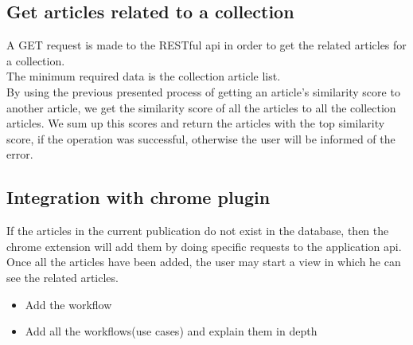 \subsection{Get articles related to a collection}
\label{sec:workflow-get-articles-related-to-collection}
A GET request is made to the RESTful api in order to get the related articles for  a collection.
\\ The minimum required data is the collection article list.
\\ By using the previous presented process of getting an article’s similarity score to another article, we get the similarity score of all the articles to all the collection articles. We sum up this scores and return the articles with the top similarity score, if the operation was successful, otherwise the user will be informed of the error.

\subsection{Integration with chrome plugin}
\label{sec:workflow-integration-with-chrome-plugin}
If the articles in the current publication do not exist in the database, then the chrome extension will add them by doing specific requests to the application api.
\\ Once all the articles have been added, the user may start a view in which he can see the related articles.


\begin{itemize}
	\item Add the workflow
	\item Add all the workflows(use cases) and explain them in depth
\end{itemize}